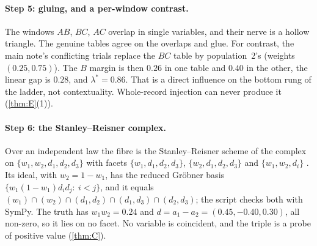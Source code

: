 \documentclass[11pt]{article}
\theoremstyle{definition}\newtheorem{definition}{Definition}\newtheorem{remark}{Remark}
\begin{document}
\paragraph{Step 5: gluing, and a per-window contrast.} The windows $AB$, $BC$, $AC$ overlap in single variables, and their nerve is a
hollow triangle. The genuine tables agree on the overlaps and glue. For contrast, the main note's conflicting trials replace the $BC$
table by population~2's (weights $(0.25,0.75)$). The $B$ margin is then $0.26$ in one table and $0.40$ in the other, the linear gap is
$0.28$, and $\lambda^*=0.86$. That is a direct influence on the bottom rung of the ladder, not contextuality. Whole-record injection can
never produce it (\cref{thm:E}(1)).

\paragraph{Step 6: the Stanley--Reisner complex.} Over an independent law the fibre is the Stanley--Reisner scheme of the complex on
$\{w_1,w_2,d_1,d_2,d_3\}$ with facets $\{w_1,d_1,d_2,d_3\}$, $\{w_2,d_1,d_2,d_3\}$ and $\{w_1,w_2,d_i\}$ \cite{PG}. Its ideal, with
$w_2=1-w_1$, has the reduced Gröbner basis $\{w_1(1-w_1)d_id_j:\ i<j\}$, and it equals
$(w_1)\cap(w_2)\cap(d_1,d_2)\cap(d_1,d_3)\cap(d_2,d_3)$; the script checks both with SymPy. The truth has $w_1w_2=0.24$ and
$d=a_1-a_2=(0.45,-0.40,0.30)$, all non-zero, so it lies on no facet. No variable is coincident, and the triple is a probe of positive
value (\cref{thm:C}).
\end{document}
